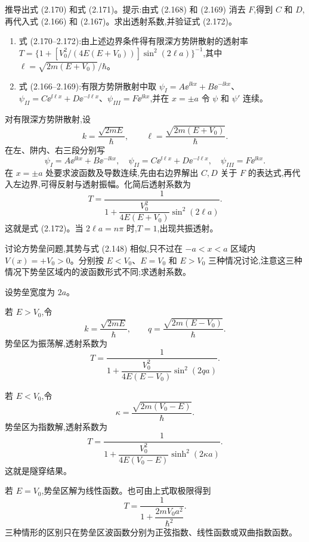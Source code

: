 \begin{question}
推导出式 (2.170) 和式 (2.171)。提示:由式 (2.168) 和 (2.169) 消去 $F$,得到 $C$ 和 $D$,再代入式 (2.166) 和 (2.167)。求出透射系数,并验证式 (2.172)。

\par\smallskip
{}
\begin{enumerate}[leftmargin=2.2em,itemsep=0.12em,topsep=0.12em,parsep=0pt]
\item 式 (2.170--2.172):由上述边界条件得有限深方势阱散射的透射率 $T=\{1+[V_0^2/(4E(E+V_0))]\sin^2(2\ell a)\}^{-1}$,其中 $\ell=\sqrt{2m(E+V_0)}/\hbar$。
\item 式 (2.166--2.169):有限方势阱散射中取 $\psi_I=A\ee^{\ii kx}+B\ee^{-\ii kx}$、$\psi_{II}=C\ee^{\ii\ell x}+D\ee^{-\ii\ell x}$、$\psi_{III}=F\ee^{\ii kx}$,并在 $x=\pm a$ 令 $\psi$ 和 $\psi'$ 连续。
\end{enumerate}

\end{question}
\begin{solution}
对有限深方势阱散射,设
\[
k=\frac{\sqrt{2mE}}{\hbar},
\qquad
\ell=\frac{\sqrt{2m(E+V_0)}}{\hbar}.
\]
在左、阱内、右三段分别写
\[
\psi_I=A\ee^{\ii kx}+B\ee^{-\ii kx},
\quad
\psi_{II}=C\ee^{\ii\ell x}+D\ee^{-\ii\ell x},
\quad
\psi_{III}=F\ee^{\ii kx}.
\]
在 $x=\pm a$ 处要求波函数及导数连续,先由右边界解出 $C,D$ 关于 $F$ 的表达式,再代入左边界,可得反射与透射振幅。化简后透射系数为
\[
T=\frac1{1+\dfrac{V_0^2}{4E(E+V_0)}\sin^2(2\ell a)}.
\]
这就是式 (2.172)。当 $2\ell a=n\pi$ 时,$T=1$,出现共振透射。
\end{solution}

\begin{question}
讨论方势垒问题,其势与式 (2.148) 相似,只不过在 $-a<x<a$ 区域内 $V(x)=+V_0>0$。分别按 $E<V_0$、$E=V_0$ 和 $E>V_0$ 三种情况讨论,注意这三种情况下势垒区域内的波函数形式不同;求透射系数。

\par\smallskip
{}

\end{question}
\begin{solution}
设势垒宽度为 $2a$。

若 $E>V_0$,令
\[
k=\frac{\sqrt{2mE}}{\hbar},
\qquad
q=\frac{\sqrt{2m(E-V_0)}}{\hbar}.
\]
势垒区为振荡解,透射系数为
\[
T=\frac1{1+\dfrac{V_0^2}{4E(E-V_0)}\sin^2(2qa)}.
\]

若 $E<V_0$,令
\[
\kappa=\frac{\sqrt{2m(V_0-E)}}{\hbar}.
\]
势垒区为指数解,透射系数为
\[
T=\frac1{1+\dfrac{V_0^2}{4E(V_0-E)}\sinh^2(2\kappa a)}.
\]
这就是隧穿结果。

若 $E=V_0$,势垒区解为线性函数。也可由上式取极限得到
\[
T=\frac1{1+\dfrac{2mV_0a^2}{\hbar^2}}.
\]
三种情形的区别只在势垒区波函数分别为正弦指数、线性函数或双曲指数函数。
\end{solution}

